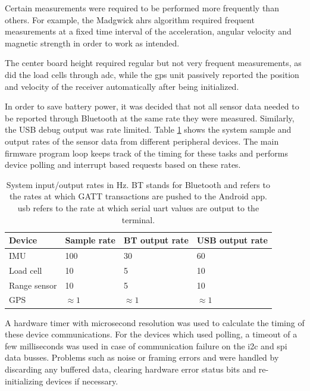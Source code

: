 Certain measurements were required to be performed more frequently than others. For example, the Madgwick \gls{ahrs} algorithm required frequent measurements at a fixed time interval of the acceleration, angular velocity and magnetic strength in order to work as intended.

The center board height required regular but not very frequent measurements, as did the load cells through \gls{adc}, while the \gls{gps} unit passively reported the position and velocity of the receiver automatically after being initialized.

In order to save battery power, it was decided that not all sensor data needed to be reported through Bluetooth at the same rate they were measured. Similarly, the USB debug output was rate limited. Table \ref{table:systemrates} shows the system sample and output rates of the sensor data from different peripheral devices. The main firmware program loop keeps track of the timing for these tasks and performs device polling and interrupt based requests based on these rates.

\begin{table}[H]
\centering
\begin{tabular}{ l | l | l | l }
  Device & Sample rate & BT output rate & USB output rate\\
  \hline
  IMU & 100 & 30 & 60\\
  Load cell & 10 & 5 & 10\\
  Range sensor & 10 & 5 & 10\\
  GPS & $\approx 1$ & $\approx 1$ & $\approx 1$\\
\end{tabular}
\caption{System input/output rates in Hz. BT stands for Bluetooth and refers to the rates at which GATT transactions are pushed to the Android app. \gls{usb} refers to the rate at which serial \gls{uart} values are output to the terminal.}
\label{table:systemrates}
\end{table}

A hardware timer with microsecond resolution was used to calculate the timing of these device communications. For the devices which used polling, a timeout of a few milliseconds was used in case of communication failure on the \gls{i2c} and \gls{spi} data busses. Problems such as noise or framing errors and were handled by discarding any buffered data, clearing hardware error status bits and re-initializing devices if necessary.
